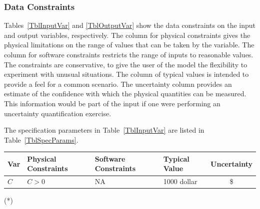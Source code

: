 \documentclass[12pt]{article}
\begin{document}
\subsubsection{Data Constraints} \label{sec_DataConstraints}    

Tables~\ref{TblInputVar} and \ref{TblOutputVar} show the data constraints on the
input and output variables, respectively.  The column for physical constraints gives
the physical limitations on the range of values that can be taken by the
variable.  The column for software constraints restricts the range of inputs to
reasonable values.  The constraints are conservative, to give the user of the
model the flexibility to experiment with unusual situations.  The column of
typical values is intended to provide a feel for a common scenario.  The
uncertainty column provides an estimate of the confidence with which the
physical quantities can be measured.  This information would be part of the
input if one were performing an uncertainty quantification exercise.

The specification parameters in Table~\ref{TblInputVar} are listed in
Table~\ref{TblSpecParams}.

\begin{table}[!h]
  \caption{Input Variables} \label{TblInputVar}
  \renewcommand{\arraystretch}{1.2}
\noindent \begin{longtable*}{l l l l c} 
  \toprule
  \textbf{Var} & \textbf{Physical Constraints} & \textbf{Software Constraints} &
                             \textbf{Typical Value} & \textbf{Uncertainty}\\
  \midrule 
  $C$ & $C > 0$ & NA & 1000 \si[per-mode=symbol] {dollar} & \$
  \\
  \bottomrule
\end{longtable*}
\end{table}

\noindent 
\begin{description}
\item[(*)] 
\end{description}

\begin{table}[!h]
\caption{Specification Parameter Values} \label{TblSpecParams}
\renewcommand{\arraystretch}{1.2}
\noindent \begin{longtable*}{l l} 
  \toprule
  \midrule 
  \bottomrule
\end{longtable*}
\end{table}
\end{document}

